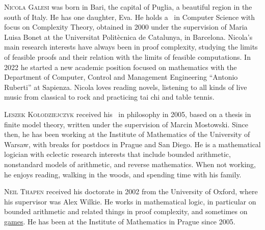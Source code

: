 \documentclass{toc}
\begin{document}
%
%
%
%
%
%
%
%
%
%
%
%
%
%
%
%
%
%
%
%
\begin{tocaboutauthors}
\begin{tocabout}[galesi]  %
  \textsc{Nicola Galesi} was born in  Bari, the capital of Puglia, a beautiful region in the
south of Italy. He has one daughter, Eva.  He holds  a \phd\ in Computer Science with focus
on Complexity Theory, obtained  in 2000   under the supervision of Maria Luisa Bonet at the
Universitat %
Polit{\`e}cnica  %
de Catalunya, in  Barcelona.  Nicola's main research interests
%
have always been  %
in proof
complexity, studying  the limits of feasible proofs  and their relation with the limits
of feasible computations.   In 2022 he started a new academic position focused on
mathematics  with the Department of Computer, Control and Management Engineering
``Antonio Ruberti'' %
at Sapienza.  %
Nicola loves reading novels, listening to all kinds of live music from classical to rock
and practicing tai chi and table tennis.
\end{tocabout}
\begin{tocabout}[kolodziejczyk]
\textsc{Leszek  Ko\l{}odziejczyk} received his \phd\ in philosophy in 2005, based on a
thesis in finite model theory, written under the supervision of Marcin Mostowski. Since then,
he has been working at the Institute of Mathematics of the University of Warsaw, with breaks
for postdocs in Prague and San Diego. He is a mathematical logician with eclectic research
interests that include bounded arithmetic, nonstandard models of arithmetic, and reverse
mathematics. When not working, he enjoys reading, walking in the woods, and spending time
with his family.
\end{tocabout}
\begin{tocabout}[thapen]
\textsc{Neil Thapen} 
received his doctorate in 2002 from the University of Oxford, where his supervisor was
Alex Wilkie. He works in mathematical logic, in particular on bounded arithmetic and
related things in proof complexity, and sometimes on 
\href{http://venuspatrol.nfshost.com/}{games}. 
He has been at the Institute of Mathematics in Prague since 2005.
\end{tocabout}
\end{tocaboutauthors}
\end{document}
